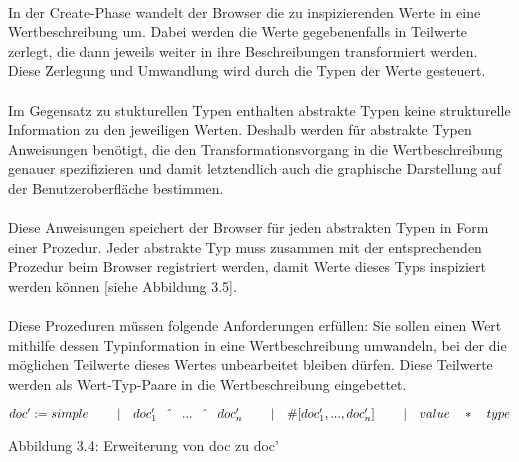 \documentclass[12pt,a4paper]{article}
\begin{document}
\paragraph{}

In der Create-Phase wandelt der Browser die zu inspizierenden 
Werte in eine Wertbeschreibung um. Dabei werden die Werte 
gegebenenfalls in Teilwerte zerlegt, die dann jeweils 
weiter in ihre Beschreibungen transformiert werden. 
Diese Zerlegung und Umwandlung wird durch die Typen der 
Werte gesteuert.

\paragraph{}

Im Gegensatz zu stukturellen Typen enthalten abstrakte Typen 
keine strukturelle Information zu den jeweiligen Werten.
Deshalb werden f\"ur abstrakte Typen Anweisungen 
ben\"otigt, die den Transformationsvorgang in die 
Wertbeschreibung genauer spezifizieren und damit letztendlich 
auch die graphische Darstellung auf der Benutzeroberfl\"ache 
bestimmen. 

\paragraph{}

Diese Anweisungen speichert der Browser f\"ur 
jeden abstrakten Typen in Form einer Prozedur. 
Jeder abstrakte Typ muss zusammen mit der entsprechenden
Prozedur beim Browser registriert werden, damit Werte 
dieses Typs inspiziert werden k\"onnen [siehe Abbildung 3.5]. 

\paragraph{}

Diese Prozeduren m\"ussen folgende Anforderungen 
erf\"ullen: Sie sollen einen Wert mithilfe dessen 
Typinformation in eine Wertbeschreibung umwandeln, 
bei der die m\"oglichen Teilwerte dieses 
Wertes unbearbeitet bleiben d\"urfen. Diese 
Teilwerte werden als Wert-Typ-Paare in 
die Wertbeschreibung eingebettet.\\[1mm]

\begin{minipage}{15cm}
\begin{math}
  doc' :=  simple\newline
  \hspace{8mm} | \quad doc'_{1} \quad \hat{} \quad ... \quad \hat{} 
                 \quad doc'_{n}\newline
  \hspace{8mm} | \quad \# \lbrack doc'_{1}, ... , doc'_{n}\rbrack\newline
  \hspace{8mm} | \quad value \quad * \quad type 
\end{math} \newline
\end{minipage}
 Abbildung 3.4: Erweiterung von doc zu doc' 
\end{document}

